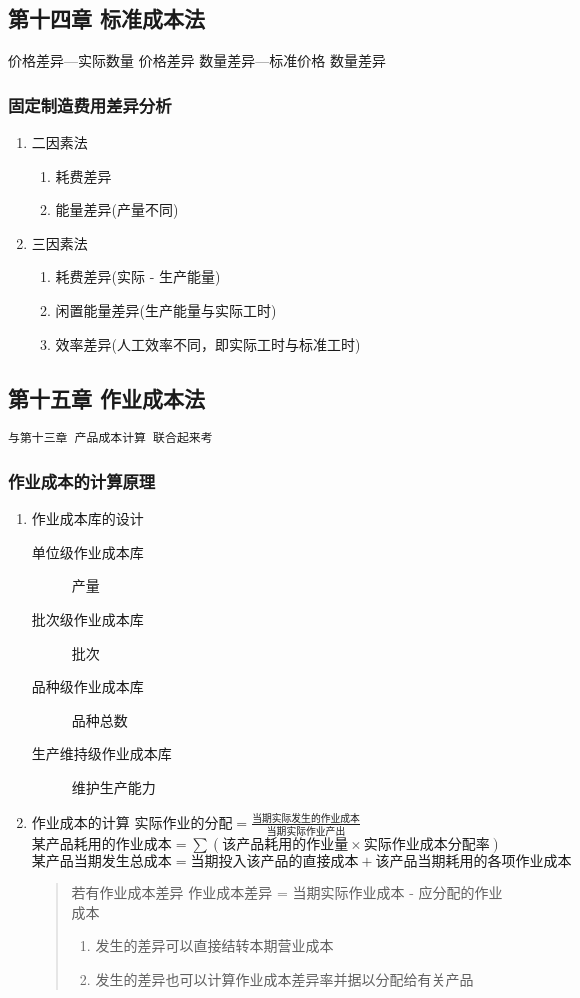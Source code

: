 \documentclass[12pt,a4paper]{article}
\begin{document}
\subsection{第十四章 标准成本法}
\label{sec:orgf9797bd}
价格差异---实际数量 \texttimes{} 价格差异
数量差异---标准价格 \texttimes{} 数量差异
\subsubsection{固定制造费用差异分析}
\label{sec:org49eec41}
\begin{enumerate}
\item 二因素法
\label{sec:org3f1568f}
\begin{enumerate}
\item 耗费差异
\item 能量差异(产量不同)
\end{enumerate}
\item 三因素法
\label{sec:orgbce759f}
\begin{enumerate}
\item 耗费差异(实际 - 生产能量)
\item 闲置能量差异(生产能量与实际工时)
\item 效率差异(人工效率不同，即实际工时与标准工时)
\end{enumerate}
\end{enumerate}
\subsection{第十五章 作业成本法}
\label{sec:org53848e7}
\texttt{与第十三章 产品成本计算 联合起来考}
\subsubsection{作业成本的计算原理}
\label{sec:orgffc838e}
\begin{enumerate}
\item 作业成本库的设计
\label{sec:org3fc23b9}
\begin{description}
\item[{单位级作业成本库}] 产量
\item[{批次级作业成本库}] 批次
\item[{品种级作业成本库}] 品种总数
\item[{生产维持级作业成本库}] 维护生产能力
\end{description}
\item 作业成本的计算
\label{sec:orgedd3ae1}
\(实际作业的分配 = \frac{当期实际发生的作业成本}{当期实际作业产出}\)
\(某产品耗用的作业成本 = \sum(该产品耗用的作业量 \times 实际作业成本分配率)\)
\(某产品当期发生总成本 = 当期投入该产品的直接成本 + 该产品当期耗用的各项作业成本\)
\begin{quote}
若有作业成本差异
作业成本差异 = 当期实际作业成本 - 应分配的作业成本
\begin{enumerate}
\item 发生的差异可以直接结转本期营业成本
\item 发生的差异也可以计算作业成本差异率并据以分配给有关产品
\end{enumerate}
\end{quote}
\end{enumerate}
\end{document}
